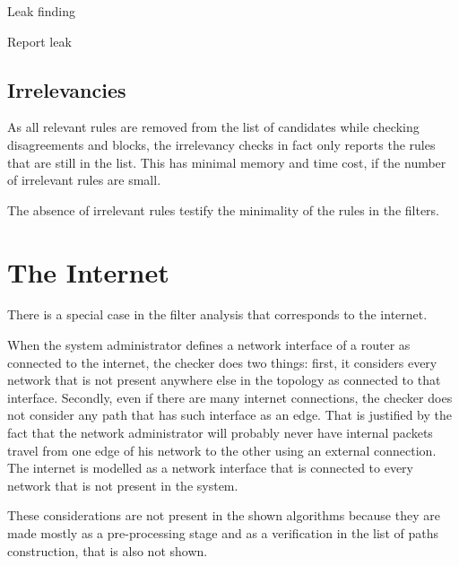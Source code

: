 \begin{algorithm}
	\caption{\label{alg:findleaks}Leak finding}
	\begin{algorithmic}[1]
					\State Report leak
				\EndIf
			\EndIf
		\EndFunction
	\end{algorithmic}
\end{algorithm}




\subsection{Irrelevancies}

As all relevant rules are removed from the list of candidates while checking
disagreements and blocks, the irrelevancy checks in fact only reports the rules
that are still in the list. This has minimal memory and time cost, if the number
of irrelevant rules are small.

The absence of irrelevant rules testify the minimality of the rules in the
filters.



\section{The Internet}

There is a special case in the filter analysis that corresponds to the internet.

When the system administrator defines a network interface of a router as
connected to the internet, the checker does two things: first, it considers
every network that is not present anywhere else in the topology as connected to
that interface. Secondly, even if there are many internet connections, the
checker does not consider any path that has such interface as an edge. That is
justified by the fact that the network administrator will probably never have
internal packets travel from one edge of his network to the other using an
external connection.  The internet is modelled as a network interface that is
connected to every network that is not present in the system.

These considerations are not present in the shown algorithms because they are
made mostly as a pre-processing stage and as a verification in the list of paths
construction, that is also not shown.





